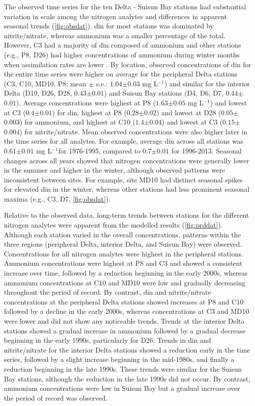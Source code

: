 \documentclass[letterpaper,12pt,oneside]{article}\usepackage[]{graphicx}\usepackage[]{color}
\newcommand{\mgl}{mg L$^{-1}$}
\begin{document}
The observed time series for the ten Delta - Suisun Bay stations had substantial variation in scale among the nitrogen analytes and differences in apparent seasonal trends (\cref{fig:obsdat}).  \ac{din} for most stations was dominated by nitrite/nitrate, whereas ammonium was a smaller percentage of the total.  However, C3 had a majority of \ac{din} composed of ammonium and other stations (e.g., P8, D26) had higher concentrations of ammonium during winter months when assimilation rates are lower \citep{Novick15}.  By location, observed concentrations of \ac{din} for the entire time series were higher on average for the peripheral Delta stations (C3, C10, MD10, P8; mean $\pm$ s.e.: $1.04$$\pm$$0.03$ \mgl) and similar for the interior Delta (D19, D26, D28, $0.43$$\pm$$0.01$) and Suisun Bay stations (D4, D6, D7, $0.44$$\pm$$0.01$).  Average concentrations were highest at P8 ($1.63$$\pm$$0.05$ \mgl) and lowest at C3 ($0.4$$\pm$$0.01$) for \ac{din}, highest at P8 ($0.28$$\pm$$0.02$) and lowest at D28 ($0.05$$\pm$$0.003$) for ammonium, and highest at C10 ($1.4$$\pm$$0.04$) and lowest at C3 ($0.15$$\pm$$0.004$) for nitrite/nitrate. Mean observed concentrations were also higher later in the time series for all analytes.  For example, average \ac{din} across all stations was $0.61$$\pm$$0.01$ \mgl for 1976-1995, compared to $0.7$$\pm$$0.01$ for 1996-2013. Seasonal changes across all years showed that nitrogen concentrations were generally lower in the summer and higher in the winter, although observed patterns were inconsistent between sites.  For example, site MD10 had distinct seasonal spikes for elevated \ac{din} in the winter, whereas other stations had less prominent seasonal maxima (e.g., C3, D7, \cref{fig:obsdat}).  

Relative to the observed data, long-term trends between stations for the different nitrogen analytes were apparent from the modelled results (\cref{fig:prddat}).  Although each station varied in the overall concentrations, patterns within the three regions (peripheral Delta, interior Delta, and Suisun Bay) were observed.  Concentrations for all nitrogen analytes were highest in the peripheral stations.  Ammonium concentrations were highest at P8 and C3 and showed a consistent increase over time, followed by a reduction beginning in the early 2000s, whereas ammonium concentrations at C10 and MD10 were low and gradually decreasing throughout the period of record.  By contrast, \ac{din} and nitrite/nitrate concentrations at the peripheral Delta stations showed increases at  P8 and C10 followed by a decline in the early 2000s, whereas concentrations at C3 and MD10 were lower and did not show any noticeable trends.  Trends at the interior Delta stations showed a gradual increase in ammonium followed by a gradual decrease beginning in the early 1990s, particularly for D26.  Trends in \ac{din} and nitrite/nitrate for the interior Delta stations showed a reduction early in the time series, followed by a slight increase beginning in the mid-1980s, and finally a reduction beginning in the late 1990s.  These trends were similar for the Suisun Bay stations, although the reduction in the late 1990s did not occur.  By contrast, ammonium concentrations were low in Suisun Bay but a gradual increase over the period of record was observed.  
\end{document}
